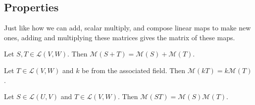 \subsection{Properties}
Just like how we can add, scalar multiply, and compose linear maps to make new ones, adding and multiplying these matrices gives the matrix of these maps.

\begin{theorem}
	Let $S, T \in \mathcal{L}(V,W)$.
	Then $\mathcal{M}(S+T) = \mathcal{M}(S) + \mathcal{M}(T)$.	
\end{theorem}

\begin{theorem}
	Let $T \in \mathcal{L}(V,W)$ and $k$ be from the associated field.
	Then $\mathcal{M}(kT) = k\mathcal{M}(T)$.
\end{theorem}

\begin{theorem}
	Let $S \in \mathcal{L}(U,V)$ and $T \in \mathcal{L}(V,W)$.
	Then $\mathcal{M}(ST) = \mathcal{M}(S)\mathcal{M}(T)$.
\end{theorem}
